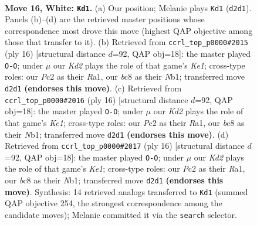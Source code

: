 \documentclass[11pt]{article}
\begin{document}
\clearpage

\begin{figure}[p]\centering
\begin{subfigure}{0.46\textwidth}\centering
\resizebox{\linewidth}{!}{%
\newchessgame
\chessboard[
  setfen={rnbqr3/2pn1kpp/pp2p3/3pPp2/3P1P1P/6Q1/PPPKN1P1/1R3BNR w - - 6 16},
  showmover=false,
  pgfstyle=straightmove, color=movearrow, markmove={d2-d1}
]}
\caption{}
\end{subfigure}\hfill
\begin{subfigure}{0.46\textwidth}\centering
\resizebox{\linewidth}{!}{%
\newchessgame
\chessboard[
  setfen={rn1qk2r/pb1p1ppp/1p2pn2/2p5/2PP4/5NP1/PPQ1PPBP/RN2K2R w KQkq - 2 9},
  showmover=false,
  pgfstyle=straightmove, color=movearrow, markmove={e1-g1}
]}
\caption{}
\end{subfigure}
\\[4pt]
\begin{subfigure}{0.46\textwidth}\centering
\resizebox{\linewidth}{!}{%
\newchessgame
\chessboard[
  setfen={rn1qk2r/pb1p1ppp/1p2pn2/2p5/2PP4/5NP1/PPQ1PPBP/RN2K2R w KQkq - 2 9},
  showmover=false,
  pgfstyle=straightmove, color=movearrow, markmove={e1-g1}
]}
\caption{}
\end{subfigure}\hfill
\begin{subfigure}{0.46\textwidth}\centering
\resizebox{\linewidth}{!}{%
\newchessgame
\chessboard[
  setfen={rn1qk2r/pb1p1ppp/1p2pn2/2p5/2PP4/5NP1/PPQ1PPBP/RN2K2R w KQkq - 2 9},
  showmover=false,
  pgfstyle=straightmove, color=movearrow, markmove={e1-g1}
]}
\caption{}
\end{subfigure}
\caption{\textbf{Move 16, White: \texttt{Kd1}.} (a) Our position; Melanie plays \texttt{Kd1} (\texttt{d2d1}). Panels (b)--(d) are the retrieved master positions whose correspondence most drove this move (highest QAP objective among those that transfer to it). (b) Retrieved from \texttt{ccrl\_top\_p0000\#2015} (ply 16) [structural distance $d$=92, QAP obj=18]: the master played \texttt{O-O}; under $\mu$ our \emph{Kd2} plays the role of that game's \emph{Ke1}; cross-type roles: our \emph{P}c2 as their \emph{R}a1, our \emph{b}c8 as their \emph{N}b1; transferred move \texttt{d2d1} \textbf{(endorses this move)}. (c) Retrieved from \texttt{ccrl\_top\_p0000\#2016} (ply 16) [structural distance $d$=92, QAP obj=18]: the master played \texttt{O-O}; under $\mu$ our \emph{Kd2} plays the role of that game's \emph{Ke1}; cross-type roles: our \emph{P}c2 as their \emph{R}a1, our \emph{b}c8 as their \emph{N}b1; transferred move \texttt{d2d1} \textbf{(endorses this move)}. (d) Retrieved from \texttt{ccrl\_top\_p0000\#2017} (ply 16) [structural distance $d$=92, QAP obj=18]: the master played \texttt{O-O}; under $\mu$ our \emph{Kd2} plays the role of that game's \emph{Ke1}; cross-type roles: our \emph{P}c2 as their \emph{R}a1, our \emph{b}c8 as their \emph{N}b1; transferred move \texttt{d2d1} \textbf{(endorses this move)}. Synthesis: 14 retrieved analogs transferred to \texttt{Kd1} (summed QAP objective 254, the strongest correspondence among the candidate moves); Melanie committed it via the \texttt{search} selector.}
\label{fig:thought-m30}
\end{figure}
\end{document}
